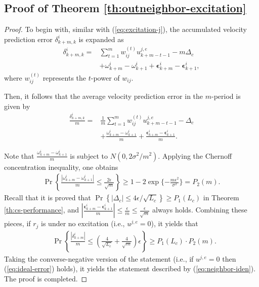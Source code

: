 \documentclass[12pt,journal,draftclsnofoot,onecolumn]{IEEEtran}
\begin{document}
\subsection{Proof of Theorem \ref{th:outneighbor-excitation}}\label{apdix:outneighbor-excitation}
\begin{proof}
To begin with, similar with (\ref{eq:excitation-j}), the accumulated velocity prediction error $\delta_{k+m,k}^{i}$ is expanded as 
\begin{align}\label{eq:velocity-increment}
\delta_{k+m,k}^{i}= &\sum\limits_{t = 1}^m {w_{ij}^{(t)}u_{k + m - t-1}^{j,e} } - m \Delta_c  \nonumber \\ 
&+{\omega_{k+m}^{i}- \omega_{k+1}^{i}} + {\bm{\epsilon}_{k+m}^{i}-\bm{\epsilon}_{k+1}^{i}}  ,
\end{align}
where ${w_{ij}^{(t)}}$ represents the $t$-power of $w_{ij}$. 


Then, it follows that the average velocity prediction error in the $m$-period is given by 
\begin{align}\label{eq:velocity-increment2}
\frac{\delta_{k+m,k}^{i}}{m}= & \frac{1}{m} \sum\limits_{t = 1}^m {w_{ij}^{(t)}u_{k + m - t-1}^{j,e} } - \Delta_c  \nonumber \\ 
&+\frac{ {\omega_{k+m}^{i}- \omega_{k+1}^{i}} }{m} + \frac{\bm{\epsilon}_{k+m}^{i}-\bm{\epsilon}_{k+1}^{i}}{m}. 
\end{align}

Note that $\frac{ {\omega_{k+m}^{i}- \omega_{k+1}^{i}} }{m}$ is subject to $N(0,2\sigma^2/m^2)$. 
Applying the Chernoff concentration inequality, one obtains
\begin{align}
\Pr\left\{ \frac{| {\omega_{k+m}^{i}- \omega_{k+1}^{i}} | }{m}  \!\le\! \frac{2\epsilon}{\sqrt{m}} \right\} \!\ge\! 1 \!-\! 2 \exp\{-\frac{ {m}\epsilon^{2}}{\sigma^{2}}\} \!=\! P_2(m).
\end{align}
Recall that it is proved that $\Pr\left\{ | \Delta_c | \le {4\epsilon }/{\sqrt{L_c}}\right\}\ge P_1(L_c) $ in Theorem \ref{th:cs-performance}, and $ |\frac{\bm{\epsilon}_{k+m}^{i}-\bm{\epsilon}_{k+1}^{i}}{m}|\le \frac{\epsilon}{m} \le \frac{\epsilon}{\sqrt{m}}$ always holds. 
Combining these pieces, if $r_j$ is under no excitation (i.e., $u^{j,e}=0$), it yields that 
\begin{align}\label{eq:ideal-error}
&\Pr\left\{ \frac{ | \delta_{k+m}^{i} | }{m} \le (\frac{4}{\sqrt{L_c}} + \frac{4}{\sqrt{m}})\epsilon \right\} \ge P_1(L_c) \cdot P_2(m) . 
\end{align}
Taking the converse-negative version of the statement (i.e., if $u^{j,e}=0$ then (\ref{eq:ideal-error}) holds), it yields the statement described by (\ref{eq:neighbor-iden}). 
The proof is completed. 
\end{proof}
\end{document}
